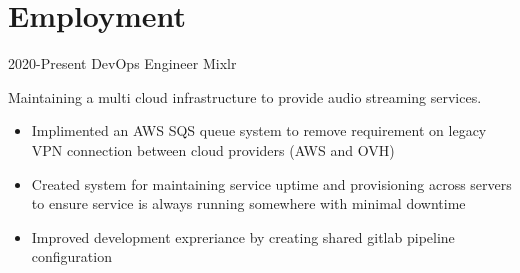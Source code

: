 \documentclass[]{friggeri-cv-a4}
\begin{document}
\section{Employment}
 \begin{entrylist}
   {2020-Present}
   {DevOps Engineer}
   {Mixlr}
   {
     Maintaining a multi cloud infrastructure to provide audio streaming services.
     \begin{itemize}
        \item Implimented an AWS SQS queue system to remove requirement on legacy VPN connection between cloud providers (AWS and OVH)
        \item Created system for maintaining service uptime and provisioning across servers to ensure service is always running somewhere with minimal downtime
        \item Improved development expreriance by creating shared gitlab pipeline configuration
     \end{itemize}
   }


\end{entrylist}
\end{document}
